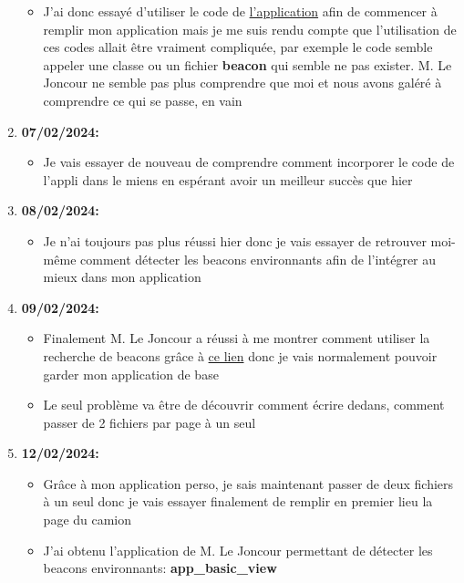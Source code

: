 \documentclass[10pt,a4paper]{book}
\begin{document}
\begin{enumerate}
\begin{itemize}
            \item J'ai donc essayé d'utiliser le code de \href{https://github.com/Gabin221/android-beacon-library-reference-kotlin}{l'application} afin de commencer à remplir mon application mais je me suis rendu compte que l'utilisation de ces codes allait être vraiment compliquée, par exemple le code semble appeler une classe ou un fichier \textbf{beacon} qui semble ne pas exister. M. Le Joncour ne semble pas plus comprendre que moi et nous avons galéré à comprendre ce qui se passe, en vain
        \end{itemize}
    \item \textbf{07/02/2024:}
        \begin{itemize}
            \item Je vais essayer de nouveau de comprendre comment incorporer le code de l'appli dans le miens en espérant avoir un meilleur succès que hier
        \end{itemize}
    \item \textbf{08/02/2024:}
        \begin{itemize}
            \item Je n'ai toujours pas plus réussi hier donc je vais essayer de retrouver moi-même comment détecter les beacons environnants afin de l'intégrer au mieux dans mon application
        \end{itemize}
    \item \textbf{09/02/2024:}
        \begin{itemize}
            \item Finalement M. Le Joncour a réussi à me montrer comment utiliser la recherche de beacons grâce à \href{https://altbeacon.github.io/android-beacon-library/configure.html}{ce lien} donc je vais normalement pouvoir garder mon application de base
            \item Le seul problème va être de découvrir comment écrire dedans, comment passer de 2 fichiers par page à un seul
        \end{itemize}
    \item \textbf{12/02/2024:}
        \begin{itemize}
            \item Grâce à mon application perso, je sais maintenant passer de deux fichiers à un seul donc je vais essayer finalement de remplir en premier lieu la page du camion
            \item J'ai obtenu l'application de M. Le Joncour permettant de détecter les beacons environnants: \textbf{app\_basic\_view}

\end{itemize}
\end{enumerate}
\end{document}
